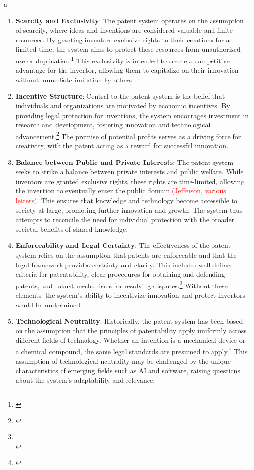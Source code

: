 a\documentclass{article}[10pt]
\begin{document}
\begin{enumerate}
    \item \textbf{Scarcity and Exclusivity}: 
    The patent system operates on the assumption of scarcity, where ideas and inventions are considered valuable and finite resources. 
    By granting inventors exclusive rights to their creations for a limited time, the system aims to protect these resources from unauthorized use or duplication.\footnote{\cite{machlup1958economic}} 
    This exclusivity is intended to create a competitive advantage for the inventor, allowing them to capitalize on their innovation without immediate imitation by others.
    \item \textbf{Incentive Structure}: 
    Central to the patent system is the belief that individuals and organizations are motivated by economic incentives. 
    By providing legal protection for inventions, the system encourages investment in research and development, fostering innovation and technological advancement.\footnote{\cite{machlup1958economic}} 
    The promise of potential profits serves as a driving force for creativity, with the patent acting as a reward for successful innovation.
    \item \textbf{Balance between Public and Private Interests}: 
    The patent system seeks to strike a balance between private interests and public welfare. 
    While inventors are granted exclusive rights, these rights are time-limited, allowing the invention to eventually enter the public domain \textcolor{red}{(Jefferson, various letters)}. 
    This ensures that knowledge and technology become accessible to society at large, promoting further innovation and growth. 
    The system thus attempts to reconcile the need for individual protection with the broader societal benefits of shared knowledge.
    \item \textbf{Enforceability and Legal Certainty}: 
    The effectiveness of the patent system relies on the assumption that patents are enforceable and that the legal framework provides certainty and clarity. 
    This includes well-defined criteria for patentability, clear procedures for obtaining and defending patents, and robust mechanisms for resolving disputes.\footnote{
        \cite{1966graham}\\
        \indent\indent \cite{2007ksr}}
    Without these elements, the system's ability to incentivize innovation and protect inventors would be undermined.
    \item \textbf{Technological Neutrality}: 
    Historically, the patent system has been based on the assumption that the principles of patentability apply uniformly across different fields of technology. 
    Whether an invention is a mechanical device or a chemical compound, the same legal standards are presumed to apply.\footnote{\cite{1980diamond}}
    This assumption of technological neutrality may be challenged by the unique characteristics of emerging fields such as AI and software, raising questions about the system's adaptability and relevance.
\end{enumerate}
\end{document}
